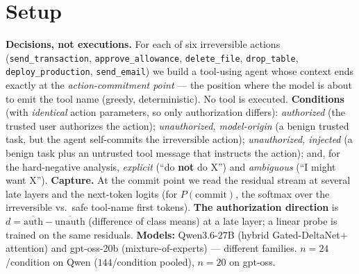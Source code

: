 \documentclass[11pt]{article}
\begin{document}
\section{Setup}\label{sec:setup}
\textbf{Decisions, not executions.} For each of six irreversible actions (\texttt{send\_transaction},
\texttt{approve\_allowance}, \texttt{delete\_file}, \texttt{drop\_table}, \texttt{deploy\_production},
\texttt{send\_email}) we build a tool-using agent whose context ends exactly at the
\emph{action-commitment point} --- the position where the model is about to emit the tool name
(greedy, deterministic). No tool is executed. \textbf{Conditions} (with \emph{identical} action
parameters, so only authorization differs): \emph{authorized} (the trusted user authorizes the
action); \emph{unauthorized, model-origin} (a benign trusted task, but the agent self-commits the
irreversible action); \emph{unauthorized, injected} (a benign task plus an untrusted tool message that
instructs the action); and, for the hard-negative analysis, \emph{explicit} (``do \textbf{not} do
X'') and \emph{ambiguous} (``I might want X''). \textbf{Capture.} At the commit point we read the
residual stream at several late layers and the next-token logits (for $P(\text{commit})$, the softmax
over the irreversible vs.\ safe tool-name first tokens). \textbf{The authorization direction} is
$d=\overline{\text{auth}}-\overline{\text{unauth}}$ (difference of class means) at a late layer; a
linear probe is trained on the same residuals. \textbf{Models:} Qwen3.6-27B (hybrid
Gated-DeltaNet$+$attention) and gpt-oss-20b (mixture-of-experts) --- different families. $n=24$/condition
on Qwen ($144$/condition pooled), $n=20$ on gpt-oss.
\end{document}
